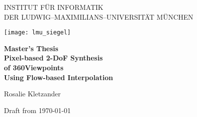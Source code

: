 \let\textacute\'

\thispagestyle{empty}

\begin{center}

\vspace*{-2cm}

{\Huge INSTITUT FÜR INFORMATIK\\[1mm]}
DER LUDWIG--MAXIMILIANS--UNIVERSITÄT MÜNCHEN\\

\vspace*{1cm}

\texttt{[image: lmu\_siegel]}

\vspace*{2cm}

{\Large \textbf{Master's Thesis}}\\ %

\vspace{2.0cm}
{\Huge \textbf{Pixel-based 2-DoF Synthesis}}\\
\vspace*{3mm}
{\Huge \textbf{of 360\degree Viewpoints}}\\
\vspace*{3mm}
{\Huge \textbf{Using Flow-based Interpolation}}\\
\vspace{1.5cm}

{\LARGE Rosalie Kletzander} %

\vspace{3cm}
Draft from \today %

\end{center}

\newpage


\thispagestyle{empty}
\cleardoublepage


\thispagestyle{empty}

